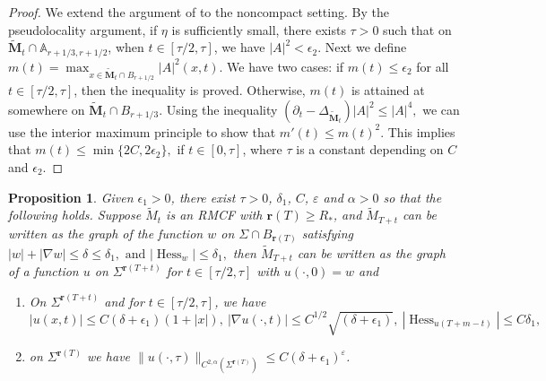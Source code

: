 \documentclass[12pt]{amsart}
\numberwithin{equation}{section}
\newtheorem{proposition}[theorem]{Proposition}
\numberwithin{equation}{section}
\newcommand{\eps}{\varepsilon}
\newcommand{\dt}{\delta}
\DeclareMathOperator{\Hess}{Hess}
\begin{document}
	\begin{proof} We extend the argument of \cite[Corollary 4.6]{CM3} to the noncompact setting. 
		By the pseudolocality argument, if $\eta$ is sufficiently small, there exists $\tau>0$ such that on $\mathbf {\widetilde M}_t\cap \mathbb A_{r+1/3,r+1/2}$, when $t\in[\tau/2,\tau]$, we have $|A|^2<\epsilon_2$. Next we define 
		$m(t)=\max_{x\in \mathbf {\widetilde M}_t\cap B_{r+1/2}}|A|^2(x,t).$
		We have two cases: if $m(t)\leq \epsilon_2$ for all $t\in[\tau/2,\tau]$, then the inequality is proved. Otherwise, $m(t)$ is attained at somewhere on $\mathbf {\widetilde M}_t\cap B_{r+1/3}$. Using the inequality
		$(\partial_t-\Delta_{\mathbf {\widetilde M}_t})|A|^2\leq |A|^4,$
		we can use the interior maximum principle to show that $ m'(t)\leq m(t)^2$. This implies that 
		$m(t)\leq \min\{2C,2\epsilon_2\},$
		if $t\in[0,\tau]$, where $\tau$ is a constant depending on $C$ and $\epsilon_2$. 
	\end{proof}
	
	\begin{proposition}\label{propHolder-small}
		Given $\epsilon_1>0$, there exist $\tau>0$, $\delta_1$, $C$, $\eps$ and $\alpha>0$ so that the following holds. Suppose $\widetilde M_t$ is an RMCF with $\mathbf{r}( T)\geq R_*$, and $\widetilde M_{T+t}$ can be written as the graph of the function $w$ on $\Sigma\cap B_{\mathbf{r}(T)}$ satisfying
		$
		|w|+|\nabla w|\leq \delta\leq \delta_1, \text{ and } |\Hess_w|\leq \delta_1,
		$
		then $\widetilde M_{T+t}$ can be written as the graph of a function $u$ on $\Sigma^{\mathbf{r}({T+t})}$ for $t\in[\tau/2,\tau]$ with  $u(\cdot,0)=w$ and  
		\begin{enumerate}
			\item On $\Sigma^{\mathbf{r}({T+t})}$ and for  $t\in[\tau/2,\tau]$, we have $$|u(x,t)|\leq C(\delta+\epsilon_1)(1+|x|),\ |\nabla u(\cdot,t)|\leq C^{1/2}\sqrt{(\delta+\epsilon_1)}, \ |\Hess_{u(T+m-t)}|\leq C\dt_1 ,$$
			\item  on $\Sigma^{\mathbf{r}(T)}$ we have $\|u(\cdot,\tau)\|_{C^{2,\alpha}(\Sigma^{\mathbf{r}(T)})}\leq C(\delta+\epsilon_1)^\eps$.
		\end{enumerate}
	\end{proposition}
	
\end{document}
